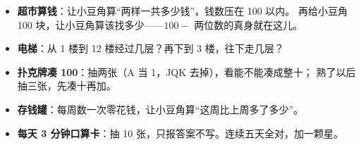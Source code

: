 \begin{itemize}
  \item \textbf{超市算钱}：让小豆角算“两样一共多少钱”，钱数压在 100 以内。
        再给小豆角 100 块，让小豆角算该找多少——$100-$ 两位数的真身就在这儿。
  \item \textbf{电梯}：从 1 楼到 12 楼经过几层？再下到 3 楼，往下走几层？
  \item \textbf{扑克牌凑 100}：抽两张（A 当 1，JQK 去掉），看能不能凑成整十；
        熟了以后抽三张，先凑十再加。
  \item \textbf{存钱罐}：每周数一次零花钱，让小豆角算“这周比上周多了多少”。
  \item \textbf{每天 3 分钟口算卡}：抽 10 张，只报答案不写。连续五天全对，加一颗星。
\end{itemize}
